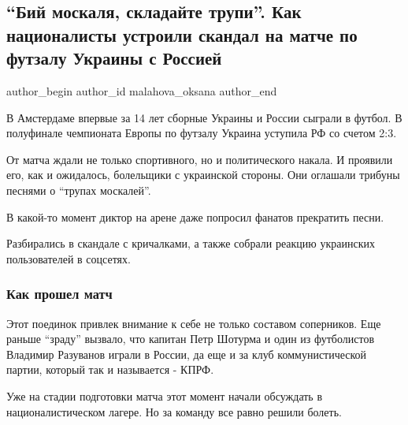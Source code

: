  
 
 
 
 
 
\subsection{\enquote{Бий москаля, складайте трупи}. Как националисты устроили скандал на матче по футзалу Украины с Россией}
\label{sec:05_02_2022.stz.news.ua.strana.2.naciz_match_ukraina_rossia}
 
\ifcmt
 author_begin
   author_id malahova_oksana
 author_end
\fi

В Амстердаме впервые за 14 лет сборные Украины и России сыграли в футбол. В
полуфинале чемпионата Европы по футзалу Украина уступила РФ со счетом 2:3.

От матча ждали не только спортивного, но и политического накала. И проявили
его, как и ожидалось, болельщики с украинской стороны. Они оглашали трибуны
песнями о \enquote{трупах москалей}. 

В какой-то момент диктор на арене даже попросил фанатов прекратить песни.

Разбирались в скандале с кричалками, а также собрали реакцию украинских
пользователей в соцсетях.

\subsubsection{Как прошел матч}

Этот поединок привлек внимание к себе не только составом соперников. Еще раньше
\enquote{зраду} вызвало, что капитан Петр Шотурма и один из футболистов Владимир
Разуванов играли в России, да еще и за клуб коммунистической партии, который
так и называется - КПРФ.

Уже на стадии подготовки матча этот момент начали обсуждать в
националистическом лагере. Но за команду все равно решили болеть. 

